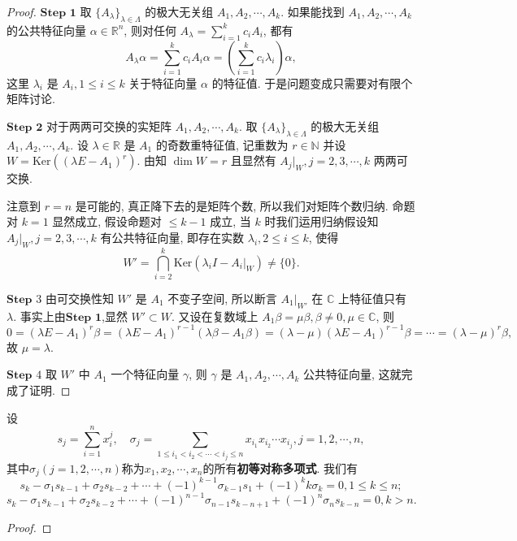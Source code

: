 \documentclass[../../main.tex]{subfiles}%
\begin{document}
\begin{proof}
 
$\mathbf{Step}\,\,\mathbf{1}$ 取 \( \{A_\lambda\}_{\lambda \in \Lambda} \) 的极大无关组 \( A_1, A_2, \cdots, A_k \). 如果能找到 \( A_1, A_2, \cdots, A_k \) 的公共特征向量 \( \alpha \in \mathbb{R}^n \), 则对任何 \( A_\lambda = \sum_{i=1}^k c_i A_i \), 都有
\[
A_\lambda \alpha = \sum_{i=1}^k c_i A_i \alpha = \left( \sum_{i=1}^k c_i \lambda_i \right) \alpha,
\]
这里 \( \lambda_i \) 是 \( A_i, 1 \leqslant i \leqslant k \) 关于特征向量 \( \alpha \) 的特征值. 于是问题变成只需要对有限个矩阵讨论.

$\mathbf{Step}\,\,\mathbf{2}$ 对于两两可交换的实矩阵 \( A_1, A_2, \cdots, A_k \). 取 \( \{A_\lambda\}_{\lambda \in \Lambda} \) 的极大无关组 \( A_1, A_2, \cdots, A_k \). 设 \( \lambda \in \mathbb{R} \) 是 \( A_1 \) 的奇数重特征值, 记重数为 \( r \in \mathbb{N} \) 并设 \( W = \mathrm{Ker} \left( (\lambda E - A_1)^r \right) \). 由知 \( \dim W = r \) 且显然有 \( A_j|_W, j = 2, 3, \cdots, k \) 两两可交换.

注意到 \( r = n \) 是可能的, 真正降下去的是矩阵个数, 所以我们对矩阵个数归纳. 命题对 \( k = 1 \) 显然成立, 假设命题对 \( \leqslant k - 1 \) 成立, 当 \( k \) 时我们运用归纳假设知 \( A_j|_W, j = 2, 3, \cdots, k \) 有公共特征向量, 即存在实数 \( \lambda_i, 2 \leqslant i \leqslant k \), 使得
\[
W' = \bigcap_{i=2}^k \mathrm{Ker} \left( \lambda_i I - A_i|_W \right) \neq \{0\}.
\]

$\mathbf{Step}\,\,3$ 由可交换性知 \( W' \) 是 \( A_1 \) 不变子空间, 所以断言 \( A_1|_{W'} \) 在 \( \mathbb{C} \) 上特征值只有 \( \lambda \). 事实上由$\mathbf{Step}\,\,\mathbf{1}$,显然 \( W' \subset W \). 又设在复数域上 \( A_1 \beta = \mu \beta, \beta \neq 0, \mu \in \mathbb{C} \), 则
\[
0 = (\lambda E - A_1)^r \beta = (\lambda E - A_1)^{r - 1} (\lambda \beta - A_1 \beta) = (\lambda - \mu)(\lambda E - A_1)^{r - 1} \beta = \cdots = (\lambda - \mu)^r \beta,
\]
故 \( \mu = \lambda \).

$\mathbf{Step}\,\,4$ 取 \( W' \) 中 \( A_1 \) 一个特征向量 \( \gamma \), 则 \( \gamma \) 是 \( A_1, A_2, \cdots, A_k \) 公共特征向量, 这就完成了证明.

\end{proof}

\begin{theorem}[Netwon公式]\label{theorem:Netwon公式}
设
\[
s_j = \sum_{i=1}^n x_i^j, \quad \sigma_j = \sum_{1 \leqslant i_1 < i_2 < \cdots < i_j \leqslant n} x_{i_1}x_{i_2} \cdots x_{i_j}, j = 1, 2, \cdots, n,
\]
其中$\sigma_j(j=1,2,\cdots,n)$称为$x_1,x_2,\cdots,x_n$的所有\textbf{初等对称多项式}.
我们有
\[
s_k - \sigma_1 s_{k - 1} + \sigma_2 s_{k - 2} + \cdots + (-1)^{k - 1} \sigma_{k - 1} s_1 + (-1)^k k \sigma_k = 0, 1 \leqslant k \leqslant n;
\]
\[
s_k - \sigma_1 s_{k - 1} + \sigma_2 s_{k - 2} + \cdots + (-1)^{n - 1} \sigma_{n - 1} s_{k - n + 1} + (-1)^n \sigma_n s_{k - n} = 0, k > n.
\]
\end{theorem}
\begin{proof}



\end{proof}
\end{document}
